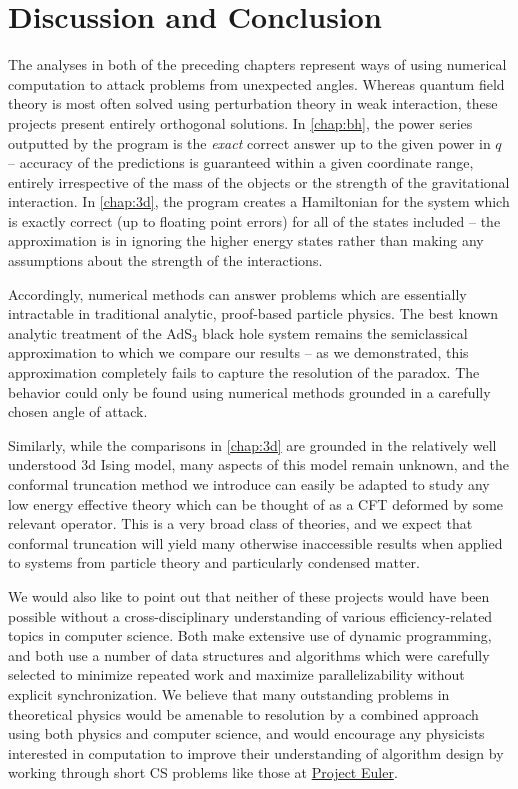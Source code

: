 \chapter{Discussion and Conclusion}
\label{chap:conclusion}

The analyses in both of the preceding chapters represent ways of using numerical
computation to attack problems from unexpected angles. Whereas quantum field 
theory is most often solved using perturbation theory in weak interaction, these
projects present entirely orthogonal solutions. In \ref{chap:bh}, the power
series outputted by the program is the \emph{exact} correct answer up to the 
given power in $q$ -- accuracy of the predictions is guaranteed within a given
coordinate range, entirely irrespective of the mass of the objects or the 
strength of the gravitational interaction. In \ref{chap:3d}, the program creates
a Hamiltonian for the system which is exactly correct (up to floating point 
errors) for all of the states included -- the approximation is in ignoring the
higher energy states rather than making any assumptions about the strength of
the interactions.

Accordingly, numerical methods can answer problems which are essentially 
intractable in traditional analytic, proof-based particle physics. The best
known analytic treatment of the AdS$_3$ black hole system remains the 
semiclassical approximation to which we compare our results -- as we 
demonstrated, this approximation completely fails to capture the resolution of
the paradox. The behavior could only be found using numerical methods grounded
in a carefully chosen angle of attack.

Similarly, while the comparisons in \ref{chap:3d} are grounded in the relatively
well understood 3d Ising model, many aspects of this model remain unknown, and
the conformal truncation method we introduce can easily be adapted to study any 
low energy effective theory which can be thought of as a CFT deformed by some 
relevant operator. This is a very broad class of theories, and we expect that
conformal truncation will yield many otherwise inaccessible results when applied
to systems from particle theory and particularly condensed matter.

We would also like to point out that neither of these projects would have been
possible without a cross-disciplinary understanding of various 
efficiency-related topics in computer science. Both make extensive use of 
dynamic programming, and both use a number of data structures and algorithms 
which were carefully selected to minimize repeated work and maximize 
parallelizability without explicit synchronization. We believe that many
outstanding problems in theoretical physics would be amenable to resolution by
a combined approach using both physics and computer science, and would encourage
any physicists interested in computation to improve their understanding of 
algorithm design by working through short CS problems like those at 
\href{https://projecteuler.net}{Project Euler}.

